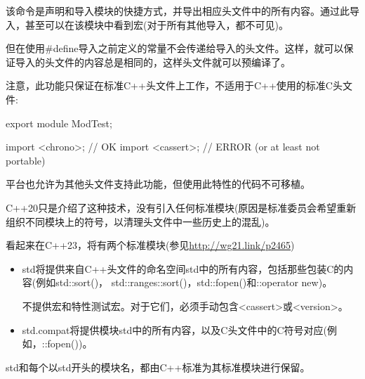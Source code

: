 该命令是声明和导入模块的快捷方式，并导出相应头文件中的所有内容。通过此导入，甚至可以在该模块中看到宏(对于所有其他导入，都不可见)。

但在使用\#define导入之前定义的常量不会传递给导入的头文件。这样，就可以保证导入的头文件的内容总是相同的，这样头文件就可以预编译了。

注意，此功能只保证在标准C++头文件上工作，不适用于C++使用的标准C头文件:

\begin{cpp}
export module ModTest;

import <chrono>; // OK
import <cassert>; // ERROR (or at least not portable)
\end{cpp}

平台也允许为其他头文件支持此功能，但使用此特性的代码不可移植。


C++20只是介绍了这种技术，没有引入任何标准模块(原因是标准委员会希望重新组织不同模块上的符号，以清理头文件中一些历史上的混乱)。

看起来在C++23，将有两个标准模块(参见\url{http://wg21.link/p2465})

\begin{itemize}
\item
std将提供来自C++头文件的命名空间std中的所有内容，包括那些包装C的内容(例如std::sort()， std::ranges::sort()，std::fopen()和::operator new)。

不提供宏和特性测试宏。对于它们，必须手动包含<cassert>或<version>。

\item
std.compat将提供模块std中的所有内容，以及C头文件中的C符号对应(例如，::fopen())。
\end{itemize}

std和每个以std开头的模块名，都由C++标准为其标准模块进行保留。













